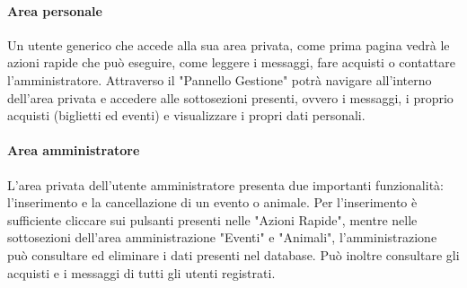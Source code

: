             \paragraph{Area personale} Un utente generico che accede alla sua area privata, come prima pagina vedrà le azioni rapide che può eseguire, come leggere i messaggi, fare acquisti o contattare l'amministratore. Attraverso il "Pannello Gestione" potrà navigare all'interno dell'area privata e accedere alle sottosezioni presenti, ovvero i messaggi, i proprio acquisti (biglietti ed eventi) e visualizzare i propri dati personali.
            \paragraph{Area amministratore} L'area privata dell'utente amministratore presenta due importanti funzionalità: l'inserimento e la cancellazione di un evento o animale. Per l'inserimento è sufficiente cliccare sui pulsanti presenti nelle "Azioni Rapide", mentre nelle sottosezioni dell'area amministrazione "Eventi" e "Animali", l'amministrazione può consultare ed eliminare i dati presenti nel database. Può inoltre consultare gli acquisti e i messaggi di tutti gli utenti registrati.

\pagebreak
